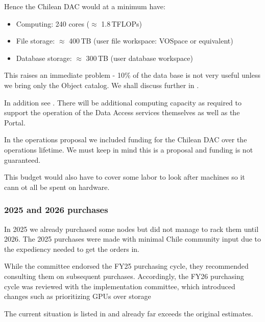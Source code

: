 Hence the Chilean DAC would at a minimum have:
\begin{itemize}
\item Computing: 240 cores ($\approx$ 1.8\,TFLOPs)
\item File storage: $\approx$ 400\,TB  (user file workspace: VOSpace or equivalent)
\item Database storage: $\approx$ 300\,TB (user database workspace)
\end{itemize}

This raises an immediate problem - 10\% of the data base is not very useful unless we bring only the Object catalog.
We shall discuss further in  .

In addition see .
There will be additional computing capacity as required to support the operation of the Data Access services themselves as well as the Portal.

In the operations proposal  we included funding for the Chilean DAC over the operations lifetime.
We must keep  in mind this is a proposal and funding is not guaranteed.

This budget would also have to cover some labor to look after machines so it cann ot all be spent on hardware.






\subsubsection {2025 and 2026 purchases}
In 2025 we already purchased some nodes but did not manage to rack them until 2026.
The 2025 purchases were made with minimal Chile community input due to the expediency needed to get the orders in.

While the committee endorsed the FY25 purchasing cycle, they recommended consulting them on subsequent purchases. Accordingly, the FY26 purchasing cycle was reviewed with the implementation committee, which introduced changes such as prioritizing GPUs over storage

The current situation is listed in  and already far exceeds the original estimates.

